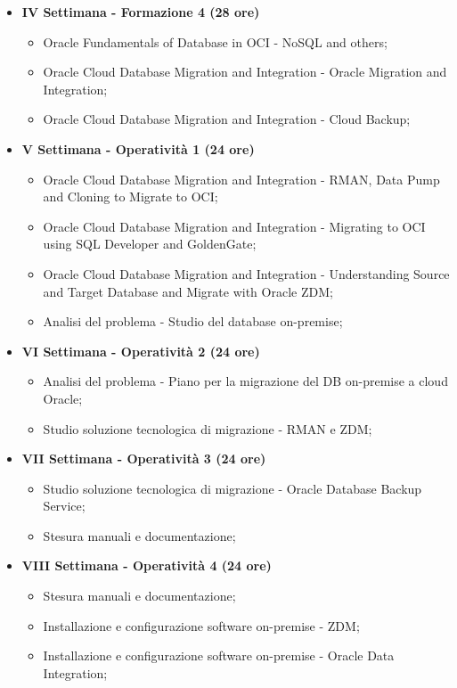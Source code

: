 {\begin{itemize}
        \item \textbf{IV Settimana - Formazione 4 (28 ore)} 
        \begin{itemize}
            \item Oracle Fundamentals of Database in OCI - NoSQL and others;
            \item Oracle Cloud Database Migration and Integration - Oracle Migration and Integration;
            \item Oracle Cloud Database Migration and Integration - Cloud Backup;
        \end{itemize}

        \item \textbf{V Settimana - Operatività 1 (24 ore)} 
        \begin{itemize}
            \item Oracle Cloud Database Migration and Integration - RMAN, Data Pump and Cloning to Migrate to OCI;
            \item Oracle Cloud Database Migration and Integration - Migrating to OCI using SQL Developer and GoldenGate;  
            \item Oracle Cloud Database Migration and Integration - Understanding Source and Target Database and Migrate with Oracle ZDM; 
            \item Analisi del problema - Studio del database on-premise;
        \end{itemize}

        \item \textbf{VI Settimana - Operatività 2 (24 ore)} 
        \begin{itemize}
            \item Analisi del problema - Piano per la migrazione del DB on-premise a cloud Oracle;
            \item Studio soluzione tecnologica di migrazione - RMAN e ZDM;
        \end{itemize}

        \item \textbf{VII Settimana - Operatività 3 (24 ore)} 
        \begin{itemize}
            \item Studio soluzione tecnologica di migrazione - Oracle Database Backup Service;
            \item Stesura manuali e documentazione;
        \end{itemize}

        \item \textbf{VIII Settimana - Operatività 4 (24 ore)} 
        \begin{itemize}
            \item Stesura manuali e documentazione;
            \item Installazione e configurazione software on-premise - ZDM;
            \item Installazione e configurazione software on-premise - Oracle Data Integration;
        \end{itemize}


\end{itemize}}
